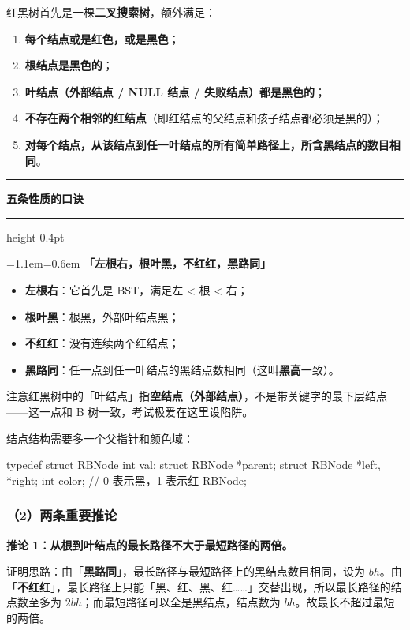 \documentclass[11pt,openany,UTF8]{ctexbook}
\newcommand{\callouthead}[2]{%
  \par\addvspace{7pt}\noindent
  {\color{#1}\rule[-0.15em]{3pt}{1.05em}}\hspace{0.5em}%
  {\bfseries\color{#1}#2}\par\nobreak\vspace{-0.35em}%
  {\color{rulesep}\hrule height 0.4pt}\nobreak\vspace{0.45em}%
  \begingroup\small\setlength{\parindent}{0pt}%
  \leftskip=1.1em\rightskip=0.6em\noindent\ignorespaces}
\newcommand{\calloutend}{\par\endgroup\addvspace{7pt}}
\newenvironment{callkey}[1]{\callouthead{keybar}{#1}}{\calloutend}
\begin{document}
红黑树首先是一棵\textbf{二叉搜索树}，额外满足：

\begin{enumerate}
\item \textbf{每个结点或是红色，或是黑色}；
\item \textbf{根结点是黑色的}；
\item \textbf{叶结点（外部结点 / NULL 结点 / 失败结点）都是黑色的}；
\item \textbf{不存在两个相邻的红结点}（即红结点的父结点和孩子结点都必须是黑的）；
\item \textbf{对每个结点，从该结点到任一叶结点的所有简单路径上，所含黑结点的数目相同}。
\end{enumerate}
\begin{callkey}{五条性质的口诀}
\textbf{「左根右，根叶黑，不红红，黑路同」}

\begin{itemize}
\item \textbf{左根右}：它首先是 BST，满足左 < 根 < 右；
\item \textbf{根叶黑}：根黑，外部叶结点黑；
\item \textbf{不红红}：没有连续两个红结点；
\item \textbf{黑路同}：任一点到任一叶结点的黑结点数相同（这叫\textbf{黑高}一致）。
\end{itemize}
注意红黑树中的「叶结点」指\textbf{空结点（外部结点）}，不是带关键字的最下层结点——这一点和 B 树一致，考试极爱在这里设陷阱。

\end{callkey}

结点结构需要多一个父指针和颜色域：

\begin{codebox}
typedef struct RBNode {
    int val;
    struct RBNode *parent;
    struct RBNode *left, *right;
    int color;      // 0 表示黑，1 表示红
} RBNode;
\end{codebox}

\subsubsection{（2）两条重要推论}

\textbf{推论 1：从根到叶结点的最长路径不大于最短路径的两倍。}

证明思路：由「\textbf{黑路同}」，最长路径与最短路径上的黑结点数目相同，设为 $bh$。由「\textbf{不红红}」，最长路径上只能「黑、红、黑、红……」交替出现，所以最长路径的结点数至多为 $2bh$；而最短路径可以全是黑结点，结点数为 $bh$。故最长不超过最短的两倍。
\end{document}
